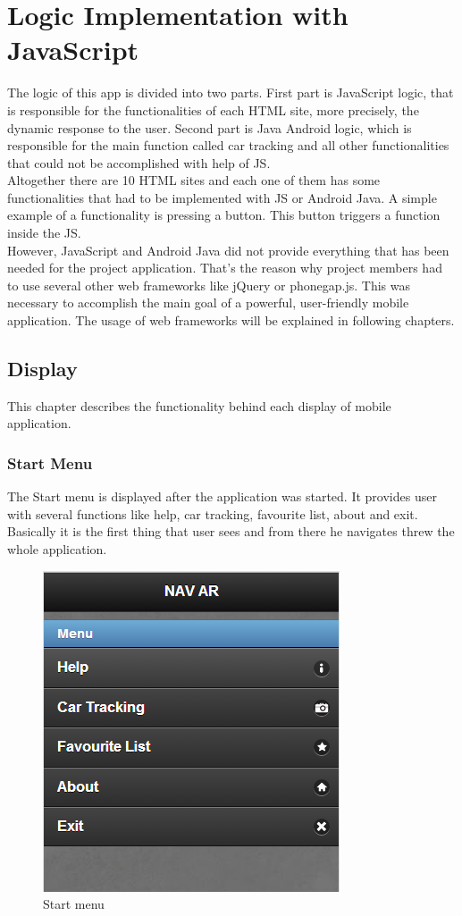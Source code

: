 \chapter{Logic Implementation with JavaScript} \label{chapter:desgin}

The logic of this app is divided into two parts. First part is JavaScript logic, that is responsible for the functionalities of each HTML site, more precisely, the dynamic response to the user. Second part is Java Android logic, which is responsible for the main function called car tracking and all other functionalities that could not be accomplished with help of JS. 
\\

Altogether there are 10 HTML sites and each one of them has some functionalities that had to be implemented with JS or Android Java. A simple example of a functionality is pressing a button. This button triggers a function inside the JS. 
\\

However, JavaScript and Android Java did not provide everything that has been needed for the project application. That's the reason why project members had to use several other web frameworks like jQuery or phonegap.js. This was necessary to accomplish the main goal of a powerful, user-friendly mobile application. The usage of web frameworks will be explained in following chapters. 
\newpage



\section{Display}
This chapter describes the functionality behind each display of mobile application. 


\subsection{Start Menu}
The Start menu is displayed after the application was started. It provides user with several functions like help, car tracking, favourite list, about and exit. Basically it is the first thing that user sees and from there he navigates threw the whole application.
\\

\begin{figure}[h]
\centering
\includegraphics[width=0.5\linewidth]{graphics/chapter4/1}
\caption{Start menu}
\end{figure}


